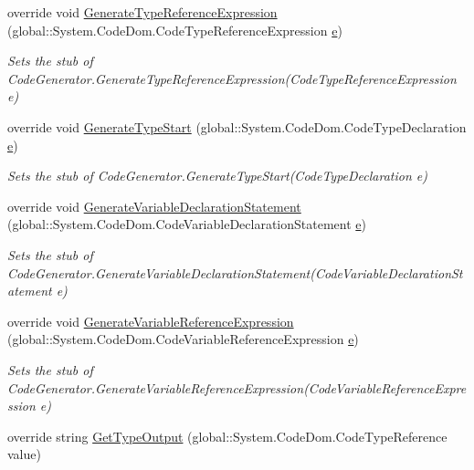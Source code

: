 \begin{DoxyCompactItemize}
override void \hyperlink{class_system_1_1_code_dom_1_1_compiler_1_1_fakes_1_1_stub_code_generator_a2575b553b6cef13862da9d05e1fb1813}{Generate\-Type\-Reference\-Expression} (global\-::\-System.\-Code\-Dom.\-Code\-Type\-Reference\-Expression \hyperlink{jquery-1_810_82_8min_8js_a2c038346d47955cbe2cb91e338edd7e1}{e})
\begin{DoxyCompactList}\small\item\em Sets the stub of Code\-Generator.\-Generate\-Type\-Reference\-Expression(\-Code\-Type\-Reference\-Expression e)\end{DoxyCompactList}\item 
override void \hyperlink{class_system_1_1_code_dom_1_1_compiler_1_1_fakes_1_1_stub_code_generator_ae9e74c23d204f38434c009d958991a4a}{Generate\-Type\-Start} (global\-::\-System.\-Code\-Dom.\-Code\-Type\-Declaration \hyperlink{jquery-1_810_82_8min_8js_a2c038346d47955cbe2cb91e338edd7e1}{e})
\begin{DoxyCompactList}\small\item\em Sets the stub of Code\-Generator.\-Generate\-Type\-Start(\-Code\-Type\-Declaration e)\end{DoxyCompactList}\item 
override void \hyperlink{class_system_1_1_code_dom_1_1_compiler_1_1_fakes_1_1_stub_code_generator_af0bf85296903bd06c62bff922a7ed4e7}{Generate\-Variable\-Declaration\-Statement} (global\-::\-System.\-Code\-Dom.\-Code\-Variable\-Declaration\-Statement \hyperlink{jquery-1_810_82_8min_8js_a2c038346d47955cbe2cb91e338edd7e1}{e})
\begin{DoxyCompactList}\small\item\em Sets the stub of Code\-Generator.\-Generate\-Variable\-Declaration\-Statement(\-Code\-Variable\-Declaration\-Statement e)\end{DoxyCompactList}\item 
override void \hyperlink{class_system_1_1_code_dom_1_1_compiler_1_1_fakes_1_1_stub_code_generator_a9cfd0a2486783717e425f113ca17eaec}{Generate\-Variable\-Reference\-Expression} (global\-::\-System.\-Code\-Dom.\-Code\-Variable\-Reference\-Expression \hyperlink{jquery-1_810_82_8min_8js_a2c038346d47955cbe2cb91e338edd7e1}{e})
\begin{DoxyCompactList}\small\item\em Sets the stub of Code\-Generator.\-Generate\-Variable\-Reference\-Expression(\-Code\-Variable\-Reference\-Expression e)\end{DoxyCompactList}\item 
override string \hyperlink{class_system_1_1_code_dom_1_1_compiler_1_1_fakes_1_1_stub_code_generator_a13813b72b2331037058928d45507fdca}{Get\-Type\-Output} (global\-::\-System.\-Code\-Dom.\-Code\-Type\-Reference value)

\end{DoxyCompactItemize}
